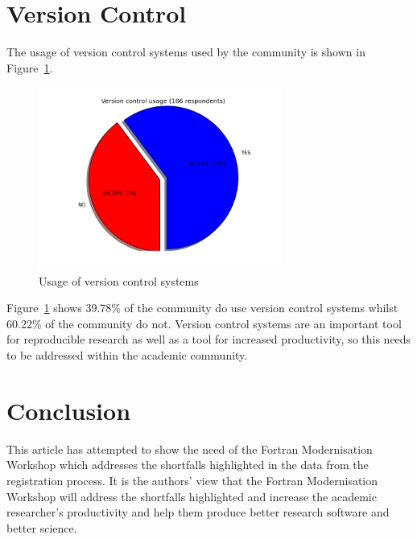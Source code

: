 \documentclass[12pt]{article}
\begin{document}
\section{Version Control}\label{vc}
The usage of version control systems used by the community is shown in 
Figure~\ref{verscon:png}.
\begin{figure}[H]
\begin{center}
\includegraphics[width=8cm,height=6cm]{verscon.png}
\caption{Usage of version control systems}\label{verscon:png}
\end{center}
\end{figure}
Figure~\ref{verscon:png} shows 39.78\% of the community do use version control systems
whilst 60.22\% of the community do not. Version control systems are an important
tool for reproducible research as well as a tool for increased productivity, so
this needs to be addressed within the academic community. 
%
\section{Conclusion}
This article has attempted to show the need of the Fortran Modernisation Workshop
which addresses the shortfalls highlighted in the data from the registration process. 
It is the authors' view that the Fortran Modernisation Workshop will address the
shortfalls highlighted and increase the academic researcher's productivity and help them
produce better research software and better science. 


\end{document}

